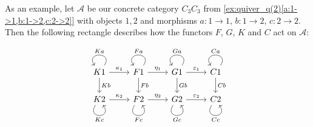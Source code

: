 \begin{example}

As an example, let $\mathcal{A}$ be our concrete category $C_{3}C_{3}$ from \ref{ex:quiver_q(2)[a:1->1,b:1->2,c:2->2]}
with objects $1,2$ and morphisms
$a : 1\rightarrow 1,\, b : 1 \rightarrow 2,\, c : 2 \rightarrow 2$. Then the following rectangle describes how the functors $F$, $G$, $K$ and $C$
act on $\mathcal{A}$:

\[
\begin{tikzcd}
K1 \arrow["Ka"', loop, distance=2em, in=125, out=55] \arrow[d, "Kb"] \arrow[r, "\kappa_{1}"] & F1 \arrow["Fa"', loop, distance=2em, in=125, out=55] \arrow[d, "Fb"] \arrow[r, "\eta_{1}"] & G1 \arrow["Ga"', loop, distance=2em, in=125, out=55] \arrow[d, "Gb"] \arrow[r, "\varepsilon_{1}"] & C1 \arrow[d, "Cb"] \arrow["Ca"', loop, distance=2em, in=125, out=55] \\
K2 \arrow["Kc"', loop, distance=2em, in=305, out=235] \arrow[r, "\kappa_{2}"]                & F2 \arrow["Fc"', loop, distance=2em, in=305, out=235] \arrow[r, "\eta_{2}"]                & G2 \arrow["Gc"', loop, distance=2em, in=305, out=235] \arrow[r, "\varepsilon_{2}"]                & C2 \arrow["Cc"', loop, distance=2em, in=305, out=235]               
\end{tikzcd}
\]


\end{example}
